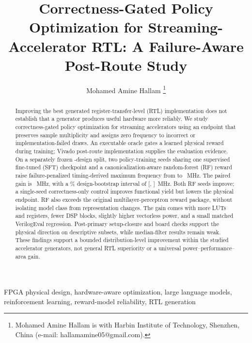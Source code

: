 \documentclass[journal]{IEEEtran}
\begin{document}
\title{Correctness-Gated Policy Optimization for Streaming-Accelerator RTL:
A Failure-Aware Post-Route Study}

\author{Mohamed Amine Hallam%
\thanks{Mohamed Amine Hallam is with Harbin Institute of Technology,
Shenzhen, China (e-mail: hallamamine05@gmail.com).}%
}

\maketitle

\begin{abstract}
Improving the best generated register-transfer-level (RTL) implementation does
not establish that a generator produces useful hardware more reliably.  We
study correctness-gated policy optimization for streaming accelerators using
an endpoint that preserves sample multiplicity and assigns zero frequency to
incorrect or implementation-failed draws.  An executable oracle gates a learned
physical reward during training; Vivado post-route implementation supplies the
evaluation evidence.  On a separately frozen
-design split, two policy-training seeds sharing
one supervised fine-tuned (SFT) checkpoint and a canonicalization-aware
random-forest (RF) reward raise failure-penalized timing-derived maximum
frequency from
 to
~MHz.  The paired gain is
~MHz, with a
\% design-bootstrap interval of
[,
]~MHz.  Both RF seeds improve; a
single-seed correctness-only control improves functional yield but lowers the
physical endpoint.  RF also exceeds the original multilayer-perceptron reward
package, without isolating model class from representation changes.  The gain
comes with more LUTs and registers, fewer DSP blocks, slightly higher vectorless
power, and a small matched VerilogEval regression.  Post-primary setup-closure
and board checks support the physical direction on descriptive subsets, while
median-filter results remain weak.  These findings support a bounded
distribution-level improvement within the studied accelerator generators, not
general RTL superiority or a universal power--performance--area gain.
\end{abstract}

\begin{IEEEkeywords}
FPGA physical design, hardware-aware optimization, large language models,
reinforcement learning, reward-model reliability, RTL generation
\end{IEEEkeywords}












\end{document}
